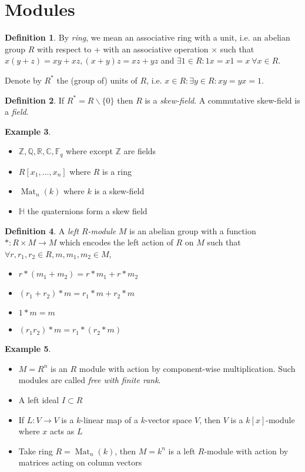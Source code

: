 \documentclass{article}
\newcommand{\F}{\mathbb{F}}
\newcommand{\Z}{\mathbb{Z}}
\newcommand{\Q}{\mathbb{Q}}
\newcommand{\R}{\mathbb{R}}
\newcommand{\Hq}{\mathbb{H}}
\newcommand{\C}{\mathbb{C}}
\newcommand{\Mat}{\operatorname{Mat}}
\theoremstyle{definition}
\newtheorem{defn}{Definition}[subsection]
\newtheorem{example}[defn]{Example}
\begin{document}
\section{Modules}
\begin{defn}
By \textit{ring}, we mean an associative ring with a unit, i.e. an abelian group $R$ with respect to + with an associative operation $\times$ such that $x(y+z)=xy+xz,(x+y)z=xz+yz$ and $\exists 1\in R:1x=x1=x \ \forall x\in R$.

Denote by $R^\ast$ the (group of) units of $R$, i.e. $x\in R:\exists y\in R:xy=yx=1$.
\end{defn}

\begin{defn}
If $R^\ast=R\backslash\{0\}$ then $R$ is a \textit{skew-field}. A commutative skew-field is a \textit{field}.
\end{defn}

\begin{example}
\begin{itemize}
\item $\Z,\Q,\R,\C,\F_q$ where except $\Z$ are fields
\item $R[x_1,\ldots,x_n]$ where $R$ is a ring
\item $\Mat_n(k)$ where $k$ is a skew-field
\item $\Hq$ the quaternions form a skew field
\end{itemize}
\end{example}

\begin{defn}
A \textit{left $R$-module} $M$ is an abelian group with a function $\ast:R\times M\rightarrow M$ which encodes the left action of $R$ on $M$ such that $\forall r,r_1,r_2\in R,m,m_1,m_2\in M$,
\begin{itemize}
\item $r\ast (m_1+m_2)=r\ast m_1+r\ast m_2$
\item $(r_1+r_2)\ast m=r_1\ast m+r_2\ast m$
\item $1\ast m=m$
\item $(r_1r_2)\ast m=r_1\ast (r_2\ast m)$
\end{itemize}
\end{defn}

\begin{example}
\begin{itemize}
\item $M=R^n$ is an $R$ module with action by component-wise multiplication. Such modules are called \textit{free with finite rank}.
\item A left ideal $I\subset R$
\item If $L:V\rightarrow V$ is a $k$-linear map of a $k$-vector space $V$, then $V$ is a $k[x]$-module where $x$ acts as $L$
\item Take ring $R=\Mat_n(k)$, then $M=k^n$ is a left $R$-module with action by matrices acting on column vectors
\end{itemize}
\end{example}
\end{document}
